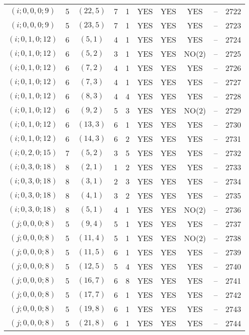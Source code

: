\begin{longtable}{|c|c|c|c|c|c|c|c|c|c|}
$(i; 0, 0, 0; 9)$ & 5 & $(22, 5)$ & 7 & 1 & YES & YES & YES & -- & 2722\\
$(i; 0, 0, 0; 9)$ & 5 & $(23, 5)$ & 7 & 1 & YES & YES & YES & -- & 2723\\
$(i; 0, 1, 0; 12)$ & 6 & $(5, 1)$ & 4 & 1 & YES & YES & YES & -- & 2724\\
$(i; 0, 1, 0; 12)$ & 6 & $(5, 2)$ & 3 & 1 & YES & YES & NO(2) & -- & 2725\\
$(i; 0, 1, 0; 12)$ & 6 & $(7, 2)$ & 4 & 1 & YES & YES & YES & -- & 2726\\
$(i; 0, 1, 0; 12)$ & 6 & $(7, 3)$ & 4 & 1 & YES & YES & YES & -- & 2727\\
$(i; 0, 1, 0; 12)$ & 6 & $(8, 3)$ & 4 & 4 & YES & YES & YES & -- & 2728\\
$(i; 0, 1, 0; 12)$ & 6 & $(9, 2)$ & 5 & 3 & YES & YES & NO(2) & -- & 2729\\
$(i; 0, 1, 0; 12)$ & 6 & $(13, 3)$ & 6 & 1 & YES & YES & YES & -- & 2730\\
$(i; 0, 1, 0; 12)$ & 6 & $(14, 3)$ & 6 & 2 & YES & YES & YES & -- & 2731\\
$(i; 0, 2, 0; 15)$ & 7 & $(5, 2)$ & 3 & 5 & YES & YES & YES & -- & 2732\\
$(i; 0, 3, 0; 18)$ & 8 & $(2, 1)$ & 1 & 2 & YES & YES & YES & -- & 2733\\
$(i; 0, 3, 0; 18)$ & 8 & $(3, 1)$ & 2 & 3 & YES & YES & YES & -- & 2734\\
$(i; 0, 3, 0; 18)$ & 8 & $(4, 1)$ & 3 & 2 & YES & YES & YES & -- & 2735\\
$(i; 0, 3, 0; 18)$ & 8 & $(5, 1)$ & 4 & 1 & YES & YES & NO(2) & -- & 2736\\
$(j; 0, 0, 0; 8)$ & 5 & $(9, 4)$ & 5 & 1 & YES & YES & YES & -- & 2737\\
$(j; 0, 0, 0; 8)$ & 5 & $(11, 4)$ & 5 & 1 & YES & YES & NO(2) & -- & 2738\\
$(j; 0, 0, 0; 8)$ & 5 & $(11, 5)$ & 6 & 1 & YES & YES & YES & -- & 2739\\
$(j; 0, 0, 0; 8)$ & 5 & $(12, 5)$ & 5 & 4 & YES & YES & YES & -- & 2740\\
$(j; 0, 0, 0; 8)$ & 5 & $(16, 7)$ & 6 & 8 & YES & YES & YES & -- & 2741\\
$(j; 0, 0, 0; 8)$ & 5 & $(17, 7)$ & 6 & 1 & YES & YES & YES & -- & 2742\\
$(j; 0, 0, 0; 8)$ & 5 & $(19, 8)$ & 6 & 1 & YES & YES & YES & -- & 2743\\
$(j; 0, 0, 0; 8)$ & 5 & $(21, 8)$ & 6 & 1 & YES & YES & YES & -- & 2744\\

\end{longtable}
